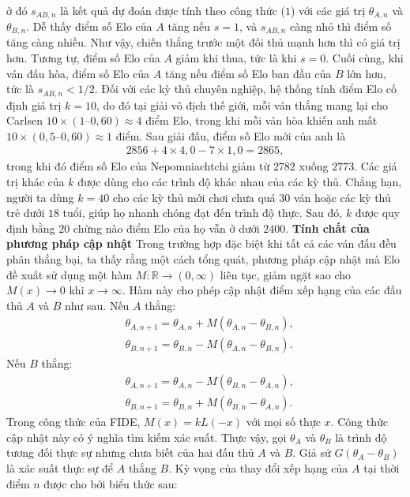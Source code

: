 \begin{multicols}{2}
\begin{align*}
	\end{align*}
	ở đó $s_{AB, n}$ là kết quả dự đoán được tính theo công thức ($1$) với các giá trị $\theta_{A, n}$ và $\theta_{B, n}$. Dễ thấy điểm số Elo của $A$ tăng nếu $s = 1$, và $s_{AB, n}$ càng nhỏ thì điểm số tăng càng nhiều. Như vậy, chiến thắng trước một đối thủ mạnh hơn thì có giá trị hơn. Tương tự, điểm số Elo của $A$ giảm khi thua, tức là khi $s = 0$. Cuối cùng, khi ván đấu hòa, điểm số Elo của $A$ tăng nếu điểm số Elo ban đầu của $B$ lớn hơn, tức là $s_{AB, n} < 1/2$.
	Đối với các kỳ thủ chuyên nghiệp, hệ thống tính điểm Elo cố định giá trị $k = 10$, do đó tại giải vô địch thế giới, mỗi ván thắng mang lại cho Carlsen $10 \times (1 – 0{,}60) \approx 4$ điểm Elo, trong khi mỗi ván hòa khiến anh mất $10 \times (0{,}5 – 0{,}60) \approx 1$ điểm. Sau giải đấu, điểm số Elo mới của anh là
	\begin{align*}
		2856 + 4 \times 4{,}0 - 7 \times 1{,}0 = 2865,
	\end{align*}
	trong khi đó điểm số Elo của Nepomniachtchi giảm từ $2782$ xuống $2773$.
	\vskip 0.05cm
	Các giá trị khác của $k$ được dùng cho các trình độ khác nhau của các kỳ thủ. Chẳng hạn, người ta dùng $k = 40$ cho các kỳ thủ mới chơi chưa quá $30$ ván hoặc các kỳ thủ trẻ dưới $18$ tuổi, giúp họ nhanh chóng đạt đến trình độ thực. Sau đó, $k$ được quy định bằng $20$ chừng nào điểm Elo của họ vẫn ở dưới $2400$.
	\vskip 0.05cm
	\textbf{\color{toanhocdoisong}Tính chất của phương pháp cập nhật}
	\vskip 0.05cm
	Trong trường hợp đặc biệt khi tất cả các ván đấu đều phân thắng bại, ta thấy rằng một cách tổng quát, phương pháp cập nhật mà Elo đề xuất sử dụng một hàm $M: \mathbb R \rightarrow (0, \infty)$ liên tục, giảm ngặt sao cho $M(x) \rightarrow 0$ khi $x \rightarrow \infty$. Hàm này cho phép cập nhật điểm xếp hạng của các đấu thủ $A$ và $B$ như sau.
	\vskip 0.05cm
	Nếu $A$ thắng:
	\begin{align*}
		&\theta_{A, n  +1} = \theta_{A, n} + M(\theta_{A, n} - \theta_{B, n}),\\
		&\theta_{B, n  +1} = \theta_{B, n} - M(\theta_{A, n} - \theta_{B, n}).
	\end{align*}
	Nếu $B$ thắng:
	\begin{align*}
		&\theta_{A, n  +1} = \theta_{A, n} - M(\theta_{B, n} - \theta_{A, n}),\\
		&\theta_{B, n  +1} = \theta_{B, n} + M(\theta_{B, n} - \theta_{A, n}).
	\end{align*}
	Trong công thức của FIDE, $M(x) = k L(-x)$ với mọi số thực $x$.
	\vskip 0.01cm
	Công thức cập nhật này có ý nghĩa tìm kiếm xác suất. Thực vậy, gọi $\theta_A$ và $\theta_B$ là trình độ tương đối thực sự nhưng chưa biết của hai đấu thủ $A$ và $B$. Giả sử $G(\theta_A - \theta_B)$ là xác suất thực sự để $A$ thắng $B$. Kỳ vọng của thay đổi xếp hạng của $A$ tại thời điểm $n$ được cho bởi biểu thức sau:

\end{multicols}
